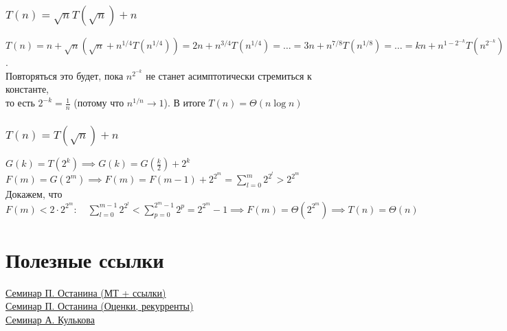 \documentclass{article}
\begin{document}
\subsubsection{$T(n) = \sqrt nT(\sqrt n) + n$}
$T(n) = n + \sqrt n (\sqrt n + n^{1/4}T(n^{1/4})) = 2n + n^{3/4}T(n^{1/4}) = \dotsc = 3n + n^{7/8}T(n^{1/8}) = \dotsc = kn + n^{1-2^{-k}}T(n^{2^{-k}})$.\\
Повторяться это будет, пока $n^{2^{-k}}$ не станет асимптотически стремиться к константе, \\
то есть $2^{-k} = \frac{1}{n}$ (потому что $n^{1/n} \rightarrow 1$). 
В итоге $\boxed{T(n) = \Theta(n\log n)}$

\subsubsection{$T(n) = T(\sqrt n) + n$}
$G(k) = T(2^k) \implies G(k) = G(\frac{k}{2}) + 2^k$ \\
$F(m) = G(2^m) \implies F(m) = F(m-1) + 2^{2^m} = \sum\limits_{l=0}^{m} 2^{2^l} > 2^{2^m}$ \\
Докажем, что $F(m) < 2\cdot2^{2^m}: \quad \sum\limits_{l=0}^{m-1} 2^{2^l} < \sum\limits_{p=0}^{2^{m} - 1} 2^{p} = 2^{2^m} - 1 \implies F(m) = \Theta(2^{2^m}) \implies \boxed{T(n) = \Theta(n)}$

\section{Полезные ссылки}
\href{https://vk.com/algo675?w=wall-139602945_5}{Семинар П. Останина (МТ + ссылки)}\\
\href{https://vk.com/algo675?w=wall-139602945_167}{Семинар П. Останина (Оценки, рекурренты)}\\
\href{https://vk.com/doc14914624_459299493?hash=21e416fbd55f65e820&dl=3ca48d6d91411a75c2}{Семинар А. Кулькова}\\
\end{document}
